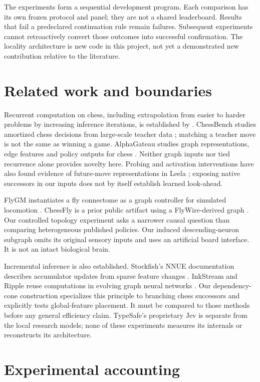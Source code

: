 \documentclass{article}
\begin{document}
The experiments form a sequential development program. Each comparison has its
own frozen protocol and panel; they are not a shared leaderboard. Results that
fail a predeclared continuation rule remain failures. Subsequent experiments
cannot retroactively convert those outcomes into successful confirmation.
The locality architecture is new code in this project, not yet a demonstrated
new contribution relative to the literature.

\section{Related work and boundaries}
Recurrent computation on chess, including extrapolation from easier to harder
problems by increasing inference iterations, is established by
\citet{schwarzschild2021}. ChessBench studies amortized chess decisions from
large-scale teacher data \citep{ruoss2024}; matching a teacher move is not the
same as winning a game. AlphaGateau studies graph representations, edge features
and policy outputs for chess \citep{rigaux2024}. Neither graph inputs nor tied
recurrence alone provides novelty here.
Probing and activation interventions have also found evidence of future-move
representations in Leela \citep{jenner2024}; exposing native successors in our
inputs does not by itself establish learned look-ahead.

FlyGM instantiates a fly connectome as a graph controller for simulated
locomotion \citep{jin2026}. ChessFly is a prior public artifact using a
FlyWire-derived graph \citep{chessfly}. Our controlled topology experiment asks
a narrower causal question than comparing heterogeneous published policies.
Our induced descending-neuron subgraph omits its original sensory inputs and
uses an artificial board interface. It is not an intact biological brain.

Incremental inference is also established. Stockfish's NNUE documentation
describes accumulator updates from sparse feature changes \citep{nnue}.
InkStream and Ripple reuse computations in evolving graph neural networks
\citep{wu2023,naman2025}. Our dependency-cone construction specializes this
principle to branching chess successors and explicitly tests global-feature
placement. It must be compared to those methods before any general efficiency
claim. TypeSafe's proprietary Jev is separate from the local research models;
none of these experiments measures its internals or reconstructs its architecture.

\section{Experimental accounting}
\end{document}
